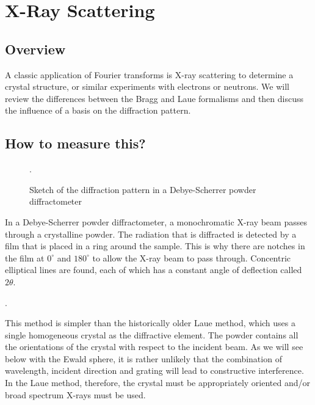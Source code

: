 \renewcommand{\chapterauthors}{Markus Lippitz}
\renewcommand{\lastmod}{October 23, 2026}


\chapter{X-Ray Scattering}




\section{Overview}
A classic application of Fourier transforms is X-ray scattering to determine a crystal structure, or similar experiments with electrons or neutrons. We will review the differences between the Bragg and Laue formalisms and then discuss the influence of a basis on the diffraction pattern.

\section{How to measure this?}

\begin{figure}
  \caption{Sketch of the diffraction pattern in a Debye-Scherrer powder diffractometer}.
\end{figure}


In a Debye-Scherrer powder diffractometer, a monochromatic X-ray beam passes through a crystalline powder. The radiation that is diffracted is detected by a film that is placed in a ring around the sample. This is why there are notches in the film at $0^\circ$ and $180^\circ$ to allow the X-ray beam to pass through. Concentric elliptical lines are found, each of which has a constant angle of deflection called $2\theta$.

\begin{marginfigure}
  \caption{Sketch of a powder diffractometer according to Debye-Scherrer}.
\end{marginfigure}

This method is simpler than the historically older Laue method, which uses a single homogeneous crystal as the diffractive element. The powder contains all the orientations of the crystal with respect to the incident beam. As we will see below with the Ewald sphere, it is rather unlikely that the combination of wavelength, incident direction and grating will lead to constructive interference. In the Laue method, therefore, the crystal must be appropriately oriented and/or broad spectrum X-rays must be used.

